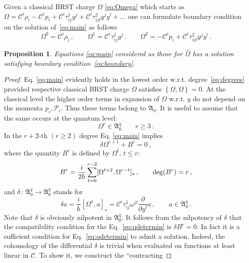 \documentclass[a4paper,11pt,oneside]{amsart}
\theoremstyle{plain}
\numberwithin{equation}{section} %
\numberwithin{figure}{section} %
\newtheorem{fact}{Proposition}[section]
\newcommand{\qcommut}[2]{[#1,#2]_\star}
\newcommand{\pb}[2]{\left\{{}#1{},{}#2{}\right\}}
\renewcommand{\deg}[1]{{\rm deg}(#1)}
\def\d{\partial}
\newcommand{\dl}[1]{\displaystyle\frac{{\d}}{\d #1}}
\def\cP{{\mathcal P}}
\def\cc{{\mathcal C}}
\def\aA{{ \mathfrak A}}
\begin{document}
\noindent
Given a classical BRST charge $\Omega$ \eqref{eq:Omega} which starts
as $\Omega=\cc^i\rho_i-\cc^i p_i+\cc^i\tau^1_{ij}y^j
+\cc^i\tau^2_{ijl}y^jy^l+\ldots$
one can formulate boundary condition on the solution
of~\eqref{eq:main} as follows
\begin{equation}
\label{eq:boundary}
  \Omega^0=\cc^i \rho_i\,,\qquad
  \Omega^1=\cc^i \tau^1_{ij}y^j\,.\qquad
  \Omega^2=-\cc^i p_i+\cc^i \tau^2_{ijl}y^jy^l \,.
\end{equation}
\begin{fact}\label{fact:main}
Equations \eqref{eq:main} considered as those for $\hat\Omega$
has a solution satisfying boundary condition~\eqref{eq:boundary}.
\end{fact}
\begin{proof}
Eq. \eqref{eq:main} evidently holds in the lowest order
w.r.t.  degree~\eqref{eq:degrees} provided respective
classical BRST charge $\Omega$ satisfies
$\pb{\Omega}{\Omega}=0$.  At the classical level the
higher order terms in expansion of $\Omega$ w.r.t. $y$ do
not depend on the momenta $p_i,\cP_i$.  Thus these terms belong
to $\aA_0$.  It is useful to assume that the
same occurs at the quantum level:
\begin{equation}
\Omega^r\in \aA^q_0 \qquad r \geq 3\,.
\label{eq:A0assumption}
\end{equation}
In the $r+2$-th $(r \geq 2)$ degree
Eq. \eqref{eq:main} implies
\begin{equation}
\label{eq:qdetermin}
\delta\Omega^{r+1}+B^r=0\,,
\end{equation}
where the quantity $B^r$ is
defined by $\Omega^t,\,t \leq r$:
\begin{equation}
B^r=\frac{i}{2\hbar}\sum_{t=0}^{r-2}
\qcommut{\Omega^{t+2}}{\Omega^{r-t}}\,,
\qquad
\deg{B^r}=r\,,
\end{equation}
and $\delta\,:\,\aA^q_0\to \aA^q_0$ stands for
\begin{equation}
  \delta a = \frac{i}{\hbar}\qcommut{\Omega^1}{a}
  = \cc^i\tau^1_{ij}\omega^{jl}\dl{y^l} a\,,
  \qquad a \in \aA^q_0\,.
\end{equation}
Note that $\delta$ is obviously nilpotent in
$\aA^q_0$.  It follows from the nilpotency of $\delta$ that the
compatibility condition for the Eq.~\eqref{eq:qdetermin}
is $\delta B^{r}=0$.  In fact it is a sufficient
condition for Eq.~\eqref{eq:qdetermin} to admit
a solution.  Indeed, the cohomology of the differential
$\delta$ is trivial when evaluated on functions at least linear
in $\cc$.  To show it, we construct the ``contracting

\end{proof}
\end{document}
